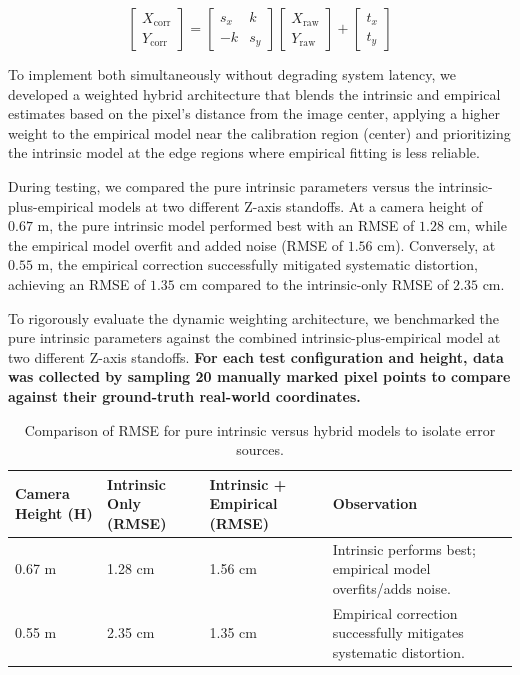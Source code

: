 \documentclass[12pt]{extarticle}
\begin{document}
$$\begin{bmatrix} X_{\text{corr}} \\ Y_{\text{corr}} \end{bmatrix} = \begin{bmatrix} s_x & k \\ -k & s_y \end{bmatrix} \begin{bmatrix} X_{\text{raw}} \\ Y_{\text{raw}} \end{bmatrix} + \begin{bmatrix} t_x \\ t_y \end{bmatrix}$$

To implement both simultaneously without degrading system latency, we developed a weighted hybrid architecture that blends the intrinsic and empirical estimates based on the pixel's distance from the image center, applying a higher weight to the empirical model near the calibration region (center) and prioritizing the intrinsic model at the edge regions where empirical fitting is less reliable.

During testing, we compared the pure intrinsic parameters versus the intrinsic-plus-empirical models at two different Z-axis standoffs. At a camera height of $0.67\text{ m}$, the pure intrinsic model performed best with an RMSE of $1.28\text{ cm}$, while the empirical model overfit and added noise (RMSE of $1.56\text{ cm}$). Conversely, at $0.55\text{ m}$, the empirical correction successfully mitigated systematic distortion, achieving an RMSE of $1.35\text{ cm}$ compared to the intrinsic-only RMSE of $2.35\text{ cm}$. 

To rigorously evaluate the dynamic weighting architecture, we benchmarked the pure intrinsic parameters against the combined intrinsic-plus-empirical model at two different Z-axis standoffs. \textbf{For each test configuration and height, data was collected by sampling 20 manually marked pixel points to compare against their ground-truth real-world coordinates.}

\begin{table}[htbp]
    \centering
    \caption{Comparison of RMSE for pure intrinsic versus hybrid models to isolate error sources.}
    \label{tab:error_isolation}
    \begin{tabular}{@{}p{2cm}p{3cm}p{3cm}p{7cm}@{}}
        \toprule
        \textbf{Camera Height (H)} & \textbf{Intrinsic Only (RMSE)} & \textbf{Intrinsic + Empirical (RMSE)} & \textbf{Observation} \\
        \midrule
        0.67 m & 1.28 cm & 1.56 cm & Intrinsic performs best; empirical model overfits/adds noise. \\
        0.55 m & 2.35 cm & 1.35 cm & Empirical correction successfully mitigates systematic distortion. \\
        \bottomrule
    \end{tabular}
\end{table}
\end{document}
